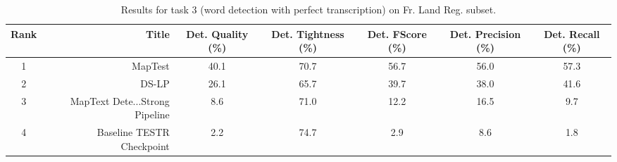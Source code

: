 \begin{table}
\caption{Results for task 3 (word detection with perfect transcription) on Fr. Land Reg. subset.}
\begin{tabular}{crccccc}
\toprule
Rank & Title & Det. Quality (\%) & Det. Tightness (\%) & Det. FScore (\%) & Det. Precision (\%) & Det. Recall (\%) \\
\midrule
1 & MapTest & 40.1 & 70.7 & 56.7 & 56.0 & 57.3 \\
2 & DS-LP & 26.1 & 65.7 & 39.7 & 38.0 & 41.6 \\
3 & MapText Dete...Strong Pipeline & 8.6 & 71.0 & 12.2 & 16.5 & 9.7 \\
4 & Baseline TESTR Checkpoint & 2.2 & 74.7 & 2.9 & 8.6 & 1.8 \\
\bottomrule
\end{tabular}
\end{table}
